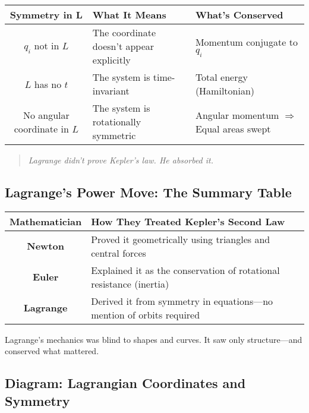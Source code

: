 \begin{center}
\renewcommand{\arraystretch}{1.5}
\begin{tabular}{|c|l|l|}
\hline
\textbf{Symmetry in L} & \textbf{What It Means} & \textbf{What’s Conserved} \\ \hline
\( q_i \) not in \( L \) & The coordinate doesn't appear explicitly & Momentum conjugate to \( q_i \) \\ \hline
\( L \) has no \( t \) & The system is time-invariant & Total energy (Hamiltonian) \\ \hline
No angular coordinate in \( L \) & The system is rotationally symmetric & Angular momentum \(\Rightarrow\) Equal areas swept \\ \hline
\end{tabular}
\end{center}

\begin{quote}
\textit{Lagrange didn’t prove Kepler’s law. He absorbed it.}
\end{quote}

\vspace{1em}

\subsection*{Lagrange’s Power Move: The Summary Table}

\begin{center}
\renewcommand{\arraystretch}{1.5}
\begin{tabular}{|c|l|}
\hline
\textbf{Mathematician} & \textbf{How They Treated Kepler’s Second Law} \\ \hline
\textbf{Newton} & Proved it geometrically using triangles and central forces \\ \hline
\textbf{Euler} & Explained it as the conservation of rotational resistance (inertia) \\ \hline
\textbf{Lagrange} & Derived it from symmetry in equations—no mention of orbits required \\ \hline
\end{tabular}
\end{center}

\vspace{0.5em}

Lagrange’s mechanics was blind to shapes and curves.  
It saw only structure—and conserved what mattered.

\subsection*{Diagram: Lagrangian Coordinates and Symmetry}

